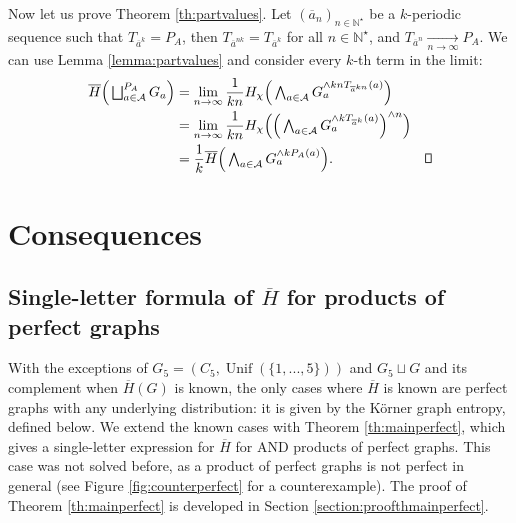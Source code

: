 \documentclass[conference,a4paper]{IEEEtran}
\DeclareMathOperator*{\Unif}{Unif}
\def\endproof{\vbox{\hrule height0.6pt\hbox{\vrule height1.3ex%
width0.6pt\hskip0.8ex\vrule width0.6pt}\hrule height0.6pt}}
\begin{document}
Now let us prove Theorem \ref{th:partvalues}. Let $(\overline{a}_n)_{n \in \mathbb{N}^\star}$ be a $k$-periodic sequence such that $T_{\overline{a}^k} = P_A$, then $T_{\overline{a}^{nk}} = T_{\overline{a}^k}$ for all $n \in \mathbb{N}^\star$, and $T_{\overline{a}^n} \underset{n \rightarrow \infty}{\rightarrow} P_A$. We can use Lemma \ref{lemma:partvalues} and consider every $k$-th term in the limit:
\begin{align}
    \overline{H}\Big(\textstyle\bigsqcup_{a \in \mathcal{A}}^{P_A} G_a\Big) & = \lim\limits_{n \rightarrow \infty} \frac{1}{kn}H_\chi\Big(\textstyle\bigwedge_{a \in \mathcal{A}} G_a^{\wedge kn T_{\overline{a}^{kn}} (a)}\Big) \nonumber\\
    & = \lim\limits_{n \rightarrow \infty} \frac{1}{kn}H_\chi\Big(\Big(\textstyle\bigwedge_{a \in \mathcal{A}} G_a^{\wedge k T_{\overline{a}^{k}} (a)}\Big)^{\wedge n}\Big) \nonumber\\
    & = \frac{1}{k} \overline{H}\Big(\textstyle\bigwedge_{a \in \mathcal{A}} G_a^{\wedge k P_A (a)}\Big). &\endproof \nonumber
\end{align}

\section{Consequences}\label{section:consequences}

\subsection{Single-letter formula of $\overline{H}$ for products of perfect graphs}\label{section:mainperfect}

With the exceptions of $G_5 = (C_5, \Unif(\lbrace 1, ..., 5\rbrace))$ and $G_5 \sqcup G$ and its complement when $\overline{H}(G)$ is known, the only cases where $\overline{H}$ is known are perfect graphs with any underlying distribution: it is given by the Körner graph entropy, defined below. 
We extend the known cases with Theorem \ref{th:mainperfect}, which gives a single-letter expression for $\overline{H}$ for AND products of perfect graphs. This case was not solved before, as a product of perfect graphs is not perfect in general (see Figure \ref{fig:counterperfect} for a counterexample). The proof of Theorem \ref{th:mainperfect} is developed in Section \ref{section:proofthmainperfect}. 
\end{document}
